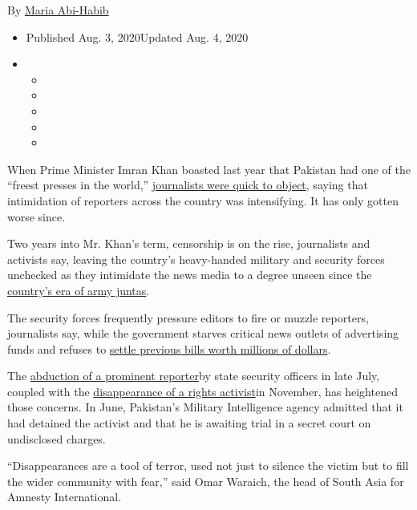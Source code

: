 By \href{https://www.nytimes3xbfgragh.onion/by/maria-abi-habib}{Maria
Abi-Habib}

\begin{itemize}
\item
  Published Aug. 3, 2020Updated Aug. 4, 2020
\item
  \begin{itemize}
  \item
  \item
  \item
  \item
  \item
  \end{itemize}
\end{itemize}

When Prime Minister Imran Khan boasted last year that Pakistan had one
of the ``freest presses in the world,''
\href{https://rsf.org/en/news/after-year-press-freedom-violations-rsf-writes-pakistans-premier}{journalists
were quick to object}, saying that intimidation of reporters across the
country was intensifying. It has only gotten worse since.

Two years into Mr. Khan's term, censorship is on the rise, journalists
and activists say, leaving the country's heavy-handed military and
security forces unchecked as they intimidate the news media to a degree
unseen since the
\href{https://tribune.com.pk/story/459782/when-musharraf-silenced-the-media}{country's
era of army juntas}.

The security forces frequently pressure editors to fire or muzzle
reporters, journalists say, while the government starves critical news
outlets of advertising funds and refuses to
\href{https://www.thenews.com.pk/print/659532-extraordinary-delay-in-payment-of-media-dues-apns-extremely-concerned-over-govt-inaction}{settle
previous bills worth millions of dollars}.

The \href{https://www.dawn.com/news/1570325}{abduction of a prominent
reporter}by state security officers in late July, coupled with the
\href{https://www.amnesty.org/en/get-involved/take-action/where-is-idris-khattak/}{disappearance
of a rights activist}in November, has heightened those concerns. In
June, Pakistan's Military Intelligence agency admitted that it had
detained the activist and that he is awaiting trial in a secret court on
undisclosed charges.

``Disappearances are a tool of terror, used not just to silence the
victim but to fill the wider community with fear,'' said Omar Waraich,
the head of South Asia for Amnesty International.

